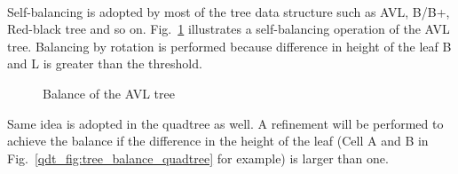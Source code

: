 \paragraph{}
Self-balancing is adopted by most of the tree data structure such as AVL, B/B+, Red-black tree and so on.
Fig.~\ref{qdt_fig:tree_balance_avl} illustrates a self-balancing operation of the AVL tree.
Balancing by rotation is performed because difference in height of the leaf B and L is greater than the threshold.
    \begin{figure}
        \centering
        \caption{Balance of the AVL tree \cite{Roura2013}}
        \label{qdt_fig:tree_balance_avl}
    \end{figure}
Same idea is adopted in the quadtree as well.
A refinement will be performed to achieve the balance if the difference in the height of the leaf (Cell A and B in Fig.~\ref{qdt_fig:tree_balance_quadtree} for example) is larger than one.

